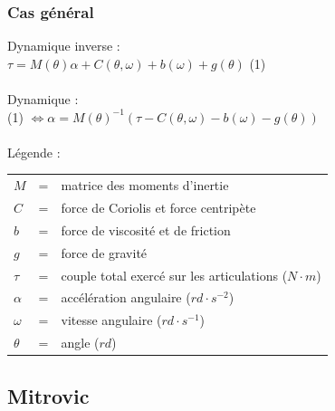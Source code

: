 \documentclass{beamer}
\begin{document}
\begin{frame}
\frametitle{Cas général}
Dynamique inverse : \\
$\tau = M(\theta)\alpha + C(\theta, \omega) + b(\omega) + g(\theta) $ (1)\\
~\\
Dynamique :\\
(1) $\Leftrightarrow \alpha = M(\theta)^{-1} (\tau - C(\theta, \omega) - b(\omega) - g(\theta)) $ \\
~\\
Légende : \\
\begin{tabular}{lcl}
    $M$      & = & matrice des moments d'inertie \\ %
    $C$      & = & force de Coriolis et force centripète \\
    $b$      & = & force de viscosité et de friction \\ %
    $g$      & = & force de gravité \\
    $\tau$   & = & couple total exercé sur les articulations ($N \cdot m$) \\
    $\alpha$ & = & accélération angulaire ($rd \cdot s^{-2}$) \\
    $\omega$ & = & vitesse angulaire ($rd \cdot s^{-1}$) \\
    $\theta$ & = & angle ($rd$) \\
\end{tabular}
\end{frame}


\subsection{Mitrovic}
\end{document}
